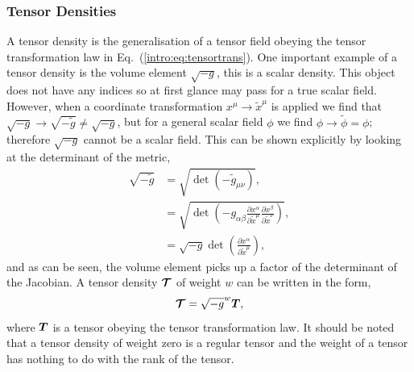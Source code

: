 \subsubsection{Tensor Densities}
A tensor density is the generalisation of a tensor field obeying the tensor transformation law in Eq.~(\ref{intro:eq:tensortrans}). One important example of a tensor density is the volume element $\sqrt{-g}$, this is a scalar density. This object does not have any indices so at first glance may pass for a true scalar field. However, when a coordinate transformation $x^\mu \rightarrow \tilde{x}^\mu$ is applied we find that $\sqrt{-g} \rightarrow \sqrt{-\tilde{g}} \neq \sqrt{-g}$, but for a general scalar field $\phi$ we find $\phi \rightarrow \tilde{\phi} = \phi$; therefore $\sqrt{-g}$ cannot be a scalar field. This can be shown explicitly by looking at the determinant of the metric,
\begin{align}
\sqrt{-\tilde{g}} &= \sqrt{\det(-\tilde{g}_{\mu\nu})},\\
&= \sqrt{\det\left(-g_{\alpha \beta} \frac{\partial x^\alpha}{\partial \tilde{x}^\mu}  \frac{\partial x^\beta}{\partial \tilde{x}^\nu} \right)} ,\\
&= \sqrt{-g} \det\left(\frac{\partial x^\alpha}{\partial \tilde{x}^\mu}\right)\label{intro:eq:rootgtrans},
\end{align}
and as can be seen, the volume element picks up a factor of the determinant of the Jacobian. A tensor density $\boldsymbol{\mathcal{T}}$ of weight $w$ can be written in the form,
\begin{equation}\boldsymbol{\mathcal{T}} = \sqrt{-g}^w\boldsymbol{T},\end{equation}
 where $\boldsymbol{T}$ is a tensor obeying the tensor transformation law. It should be noted that a tensor density of weight zero is a regular tensor and the weight of a tensor has nothing to do with the rank of the tensor.



